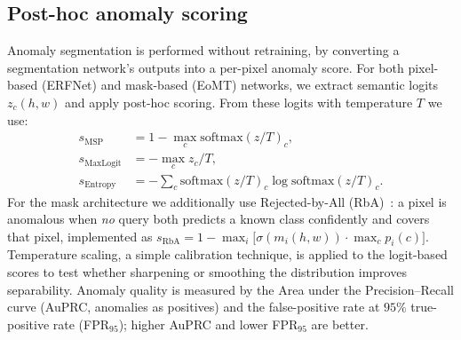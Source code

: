 \subsection{Post-hoc anomaly scoring}
\label{sec:method-anomaly}
Anomaly segmentation is performed without retraining, by converting a
segmentation network's outputs into a per-pixel anomaly score. For both pixel-based
(ERFNet) and mask-based (EoMT) networks, we extract semantic logits $z_c(h,w)$ and apply
post-hoc scoring. From these logits with temperature $T$ we use:
\begin{align}
  s_{\text{MSP}} &= 1-\max_c \mathrm{softmax}(z/T)_c, \\
  s_{\text{MaxLogit}} &= -\max_c z_c/T, \\
  s_{\text{Entropy}} &= -\textstyle\sum_c \mathrm{softmax}(z/T)_c \log \mathrm{softmax}(z/T)_c .
\end{align}
For the mask architecture we additionally use Rejected-by-All
(RbA)~\cite{rba}: a pixel is anomalous when \emph{no} query both predicts a
known class confidently and covers that pixel, implemented as
$s_{\text{RbA}} = 1-\max_i\big[\sigma(m_i(h,w))\cdot\max_{c}p_i(c)\big]$.
Temperature scaling, a simple calibration technique, is applied to the
logit-based scores to test whether sharpening or smoothing the distribution
improves separability. Anomaly quality is measured by the Area under the
Precision--Recall curve (AuPRC, anomalies as positives) and the false-positive
rate at $95\%$ true-positive rate (FPR$_{95}$); higher AuPRC and lower
FPR$_{95}$ are better.
